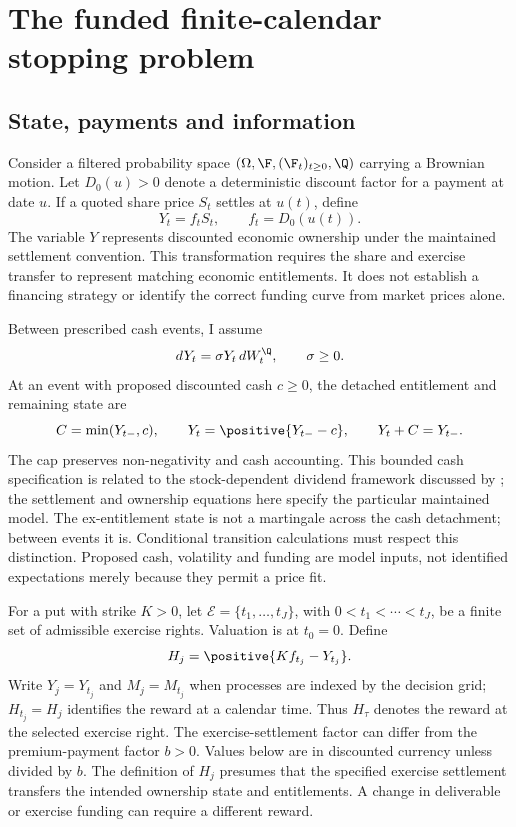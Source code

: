 \section{The funded finite-calendar stopping problem}

\subsection{State, payments and information}

Consider a filtered probability space $(\Omega,\F,(\F_t)_{t\geq0},\Q)$ carrying a Brownian motion. Let $D_0(u)>0$ denote a deterministic discount factor for a payment at date $u$. If a quoted share price $S_t$ settles at $u(t)$, define
\begin{equation}
Y_t=f_tS_t,\qquad f_t=D_0(u(t)).
\label{eq:ownership}
\end{equation}
The variable $Y$ represents discounted economic ownership under the maintained settlement convention. This transformation requires the share and exercise transfer to represent matching economic entitlements. It does not establish a financing strategy or identify the correct funding curve from market prices alone.

Between prescribed cash events, I assume
\begin{equation}
 dY_t=\sigma Y_t\,dW_t^{\Q},\qquad \sigma\geq0.
\label{eq:diffusion}
\end{equation}
At an event with proposed discounted cash $c\geq0$, the detached entitlement and remaining state are
\begin{equation}
 C=\min(Y_{t-},c),\qquad Y_t=\positive{Y_{t-}-c},
 \qquad Y_t+C=Y_{t-}.
\label{eq:cash}
\end{equation}
The cap preserves non-negativity and cash accounting. This bounded cash specification is related to the stock-dependent dividend framework discussed by \citet{vellekoop2006}; the settlement and ownership equations here specify the particular maintained model. The ex-entitlement state is not a martingale across the cash detachment; between events it is. Conditional transition calculations must respect this distinction. Proposed cash, volatility and funding are model inputs, not identified expectations merely because they permit a price fit.

For a put with strike $K>0$, let $\mathcal E=\{t_1,\ldots,t_J\}$, with $0<t_1<\cdots<t_J$, be a finite set of admissible exercise rights. Valuation is at $t_0=0$. Define
\begin{equation}
 H_j=\positive{Kf_{t_j}-Y_{t_j}}.
\label{eq:reward}
\end{equation}
Write $Y_j=Y_{t_j}$ and $M_j=M_{t_j}$ when processes are indexed by the decision grid; $H_{t_j}=H_j$ identifies the reward at a calendar time. Thus $H_\tau$ denotes the reward at the selected exercise right. The exercise-settlement factor can differ from the premium-payment factor $b>0$. Values below are in discounted currency unless divided by $b$. The definition of $H_j$ presumes that the specified exercise settlement transfers the intended ownership state and entitlements. A change in deliverable or exercise funding can require a different reward.

